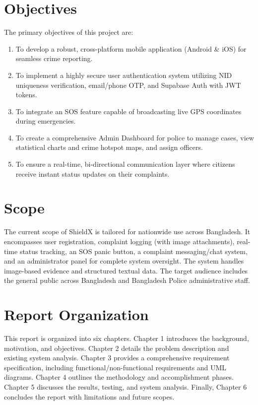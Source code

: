 \documentclass[12pt, a4paper, twoside]{report}
\begin{document}
\section{Objectives}
The primary objectives of this project are:
\begin{enumerate}
    \item To develop a robust, cross-platform mobile application (Android \& iOS) for seamless crime reporting.
    \item To implement a highly secure user authentication system utilizing NID uniqueness verification, email/phone OTP, and Supabase Auth with JWT tokens.
    \item To integrate an SOS feature capable of broadcasting live GPS coordinates during emergencies.
    \item To create a comprehensive Admin Dashboard for police to manage cases, view statistical charts and crime hotspot maps, and assign officers.
    \item To ensure a real-time, bi-directional communication layer where citizens receive instant status updates on their complaints.
\end{enumerate}
\section{Scope}
The current scope of ShieldX is tailored for nationwide use across Bangladesh. It encompasses user registration, complaint logging (with image attachments), real-time status tracking, an SOS panic button, a complaint messaging/chat system, and an administrator panel for complete system oversight. The system handles image-based evidence and structured textual data. The target audience includes the general public across Bangladesh and Bangladesh Police administrative staff.
\section{Report Organization}
This report is organized into six chapters. Chapter 1 introduces the background, motivation, and objectives. Chapter 2 details the problem description and existing system analysis. Chapter 3 provides a comprehensive requirement specification, including functional/non-functional requirements and UML diagrams. Chapter 4 outlines the methodology and accomplishment phases. Chapter 5 discusses the results, testing, and system analysis. Finally, Chapter 6 concludes the report with limitations and future scopes.
\end{document}
